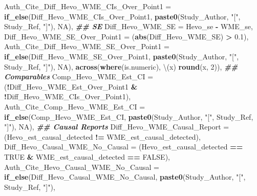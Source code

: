 \documentclass[
]{article}
\newenvironment{Shaded}{\begin{snugshade}}{\end{snugshade}}
\newcommand{\AttributeTok}[1]{\textcolor[rgb]{0.13,0.29,0.53}{#1}}
\newcommand{\ConstantTok}[1]{\textcolor[rgb]{0.56,0.35,0.01}{#1}}
\newcommand{\DecValTok}[1]{\textcolor[rgb]{0.00,0.00,0.81}{#1}}
\newcommand{\DocumentationTok}[1]{\textcolor[rgb]{0.56,0.35,0.01}{\textbf{\textit{#1}}}}
\newcommand{\FloatTok}[1]{\textcolor[rgb]{0.00,0.00,0.81}{#1}}
\newcommand{\FunctionTok}[1]{\textcolor[rgb]{0.13,0.29,0.53}{\textbf{#1}}}
\newcommand{\NormalTok}[1]{#1}
\newcommand{\SpecialCharTok}[1]{\textcolor[rgb]{0.81,0.36,0.00}{\textbf{#1}}}
\newcommand{\StringTok}[1]{\textcolor[rgb]{0.31,0.60,0.02}{#1}}
\begin{document}
\begin{Shaded}
\begin{Highlighting}[]
    \AttributeTok{Auth\_Cite\_Diff\_Hevo\_WME\_CIs\_Over\_Point1 =} \FunctionTok{if\_else}\NormalTok{(Diff\_Hevo\_WME\_CIs\_Over\_Point1,}
                                                      \FunctionTok{paste0}\NormalTok{(Study\_Author, }\StringTok{"["}\NormalTok{, Study\_Ref, }\StringTok{"]"}\NormalTok{),}
                                                      \ConstantTok{NA}\NormalTok{),}
    \DocumentationTok{\#\# SE}
    \AttributeTok{Diff\_Hevo\_WME\_SE =}\NormalTok{ Hevo\_se }\SpecialCharTok{{-}}\NormalTok{ WME\_se,}
    \AttributeTok{Diff\_Hevo\_WME\_SE\_Over\_Point1 =}\NormalTok{ (}\FunctionTok{abs}\NormalTok{(Diff\_Hevo\_WME\_SE) }\SpecialCharTok{\textgreater{}} \FloatTok{0.1}\NormalTok{),}
    \AttributeTok{Auth\_Cite\_Diff\_Hevo\_WME\_SE\_Over\_Point1 =} \FunctionTok{if\_else}\NormalTok{(Diff\_Hevo\_WME\_SE\_Over\_Point1,}
                                                     \FunctionTok{paste0}\NormalTok{(Study\_Author, }\StringTok{"["}\NormalTok{, Study\_Ref, }\StringTok{"]"}\NormalTok{),}
                                                     \ConstantTok{NA}\NormalTok{),}
    \FunctionTok{across}\NormalTok{(}\FunctionTok{where}\NormalTok{(is.numeric), \textbackslash{}(x) }\FunctionTok{round}\NormalTok{(x, }\DecValTok{2}\NormalTok{)),}
    \DocumentationTok{\#\# Comparables}
    \AttributeTok{Comp\_Hevo\_WME\_Est\_CI =}\NormalTok{ (}\SpecialCharTok{!}\NormalTok{Diff\_Hevo\_WME\_Est\_Over\_Point1 }\SpecialCharTok{\&} \SpecialCharTok{!}\NormalTok{Diff\_Hevo\_WME\_CIs\_Over\_Point1),}
    \AttributeTok{Auth\_Cite\_Comp\_Hevo\_WME\_Est\_CI =} \FunctionTok{if\_else}\NormalTok{(Comp\_Hevo\_WME\_Est\_CI,}
                                             \FunctionTok{paste0}\NormalTok{(Study\_Author, }\StringTok{"["}\NormalTok{, Study\_Ref, }\StringTok{"]"}\NormalTok{),}
                                             \ConstantTok{NA}\NormalTok{),}
    \DocumentationTok{\#\# Causal Reports}
    \AttributeTok{Diff\_Hevo\_WME\_Causal\_Report =}\NormalTok{ (Hevo\_est\_causal\_detected }\SpecialCharTok{!=}\NormalTok{ WME\_est\_causal\_detected),}
    \AttributeTok{Diff\_Hevo\_Causal\_WME\_No\_Causal =}\NormalTok{ (Hevo\_est\_causal\_detected }\SpecialCharTok{==} \ConstantTok{TRUE} \SpecialCharTok{\&}\NormalTok{ WME\_est\_causal\_detected }\SpecialCharTok{==} \ConstantTok{FALSE}\NormalTok{),}
    \AttributeTok{Auth\_Cite\_Hevo\_Causal\_WME\_No\_Causal =} \FunctionTok{if\_else}\NormalTok{(Diff\_Hevo\_Causal\_WME\_No\_Causal,}
                                                  \FunctionTok{paste0}\NormalTok{(Study\_Author, }\StringTok{"["}\NormalTok{, Study\_Ref, }\StringTok{"]"}\NormalTok{),}

\end{Highlighting}
\end{Shaded}
\end{document}
